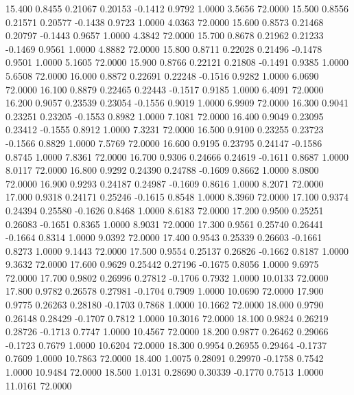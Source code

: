   15.400   0.8455   0.21067   0.20153  -0.1412   0.9792   1.0000   3.5656  72.0000
  15.500   0.8556   0.21571   0.20577  -0.1438   0.9723   1.0000   4.0363  72.0000
  15.600   0.8573   0.21468   0.20797  -0.1443   0.9657   1.0000   4.3842  72.0000
  15.700   0.8678   0.21962   0.21233  -0.1469   0.9561   1.0000   4.8882  72.0000
  15.800   0.8711   0.22028   0.21496  -0.1478   0.9501   1.0000   5.1605  72.0000
  15.900   0.8766   0.22121   0.21808  -0.1491   0.9385   1.0000   5.6508  72.0000
  16.000   0.8872   0.22691   0.22248  -0.1516   0.9282   1.0000   6.0690  72.0000
  16.100   0.8879   0.22465   0.22443  -0.1517   0.9185   1.0000   6.4091  72.0000
  16.200   0.9057   0.23539   0.23054  -0.1556   0.9019   1.0000   6.9909  72.0000
  16.300   0.9041   0.23251   0.23205  -0.1553   0.8982   1.0000   7.1081  72.0000
  16.400   0.9049   0.23095   0.23412  -0.1555   0.8912   1.0000   7.3231  72.0000
  16.500   0.9100   0.23255   0.23723  -0.1566   0.8829   1.0000   7.5769  72.0000
  16.600   0.9195   0.23795   0.24147  -0.1586   0.8745   1.0000   7.8361  72.0000
  16.700   0.9306   0.24666   0.24619  -0.1611   0.8687   1.0000   8.0117  72.0000
  16.800   0.9292   0.24390   0.24788  -0.1609   0.8662   1.0000   8.0800  72.0000
  16.900   0.9293   0.24187   0.24987  -0.1609   0.8616   1.0000   8.2071  72.0000
  17.000   0.9318   0.24171   0.25246  -0.1615   0.8548   1.0000   8.3960  72.0000
  17.100   0.9374   0.24394   0.25580  -0.1626   0.8468   1.0000   8.6183  72.0000
  17.200   0.9500   0.25251   0.26083  -0.1651   0.8365   1.0000   8.9031  72.0000
  17.300   0.9561   0.25740   0.26441  -0.1664   0.8314   1.0000   9.0392  72.0000
  17.400   0.9543   0.25339   0.26603  -0.1661   0.8273   1.0000   9.1443  72.0000
  17.500   0.9554   0.25137   0.26826  -0.1662   0.8187   1.0000   9.3632  72.0000
  17.600   0.9629   0.25442   0.27196  -0.1675   0.8056   1.0000   9.6975  72.0000
  17.700   0.9802   0.26996   0.27812  -0.1706   0.7932   1.0000  10.0133  72.0000
  17.800   0.9782   0.26578   0.27981  -0.1704   0.7909   1.0000  10.0690  72.0000
  17.900   0.9775   0.26263   0.28180  -0.1703   0.7868   1.0000  10.1662  72.0000
  18.000   0.9790   0.26148   0.28429  -0.1707   0.7812   1.0000  10.3016  72.0000
  18.100   0.9824   0.26219   0.28726  -0.1713   0.7747   1.0000  10.4567  72.0000
  18.200   0.9877   0.26462   0.29066  -0.1723   0.7679   1.0000  10.6204  72.0000
  18.300   0.9954   0.26955   0.29464  -0.1737   0.7609   1.0000  10.7863  72.0000
  18.400   1.0075   0.28091   0.29970  -0.1758   0.7542   1.0000  10.9484  72.0000
  18.500   1.0131   0.28690   0.30339  -0.1770   0.7513   1.0000  11.0161  72.0000
